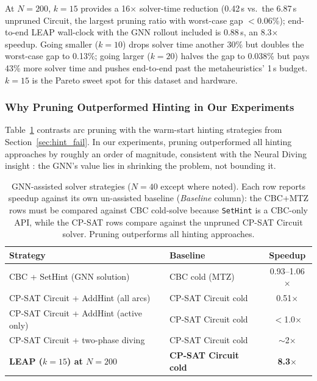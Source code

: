 \documentclass[review,times]{elsarticle}
\begin{document}
At $N{=}200$, $k{=}15$ provides a 16$\times$ solver-time reduction (0.42\,s vs.\ the 6.87\,s unpruned Circuit, the largest pruning ratio with worst-case gap $<$0.06\%); end-to-end LEAP wall-clock with the GNN rollout included is 0.88\,s, an 8.3$\times$ speedup. Going smaller ($k{=}10$) drops solver time another 30\% but doubles the worst-case gap to 0.13\%; going larger ($k{=}20$) halves the gap to 0.038\% but pays 43\% more solver time and pushes end-to-end past the metaheuristics' 1\,s budget. $k{=}15$ is the Pareto sweet spot for this dataset and hardware.

\subsubsection{Why Pruning Outperformed Hinting in Our Experiments}

Table~\ref{tab:hint_comparison} contrasts arc pruning with the warm-start hinting strategies from Section~\ref{sec:hint_fail}. In our experiments, pruning outperformed all hinting approaches by roughly an order of magnitude, consistent with the Neural Diving insight \cite{nair2021neural}: the GNN's value lies in shrinking the problem, not bounding it.

\begin{table}[htbp]
\caption{GNN-assisted solver strategies ($N{=}40$ except where noted). Each row reports speedup against its own un-assisted baseline (\textit{Baseline} column): the CBC+MTZ rows must be compared against CBC cold-solve because \texttt{SetHint} is a CBC-only API, while the CP-SAT rows compare against the unpruned CP-SAT Circuit solver. Pruning outperforms all hinting approaches.}
\label{tab:hint_comparison}
\centering
\begin{tabular}{@{}llc@{}}
\toprule
\textbf{Strategy} & \textbf{Baseline} & \textbf{Speedup} \\
\midrule
CBC + SetHint (GNN solution)            & CBC cold (MTZ)        & 0.93--1.06$\times$ \\
CP-SAT Circuit + AddHint (all arcs)     & CP-SAT Circuit cold   & 0.51$\times$ \\
CP-SAT Circuit + AddHint (active only)  & CP-SAT Circuit cold   & $<$1.0$\times$ \\
CP-SAT Circuit + two-phase diving       & CP-SAT Circuit cold   & $\sim$2$\times$ \\
\textbf{LEAP ($k{=}15$) at $N{=}200$}   & \textbf{CP-SAT Circuit cold} & \textbf{8.3$\times$} \\
\bottomrule
\end{tabular}
\end{table}
\end{document}
